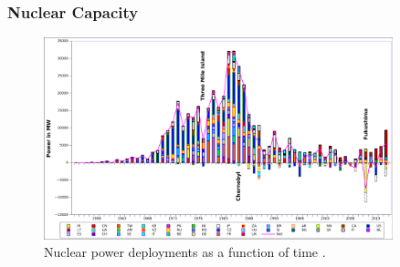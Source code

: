 \begin{frame}
  \frametitle{Nuclear Capacity}
  \begin{figure}[htbp!]
    \begin{center}
      \includegraphics[width=0.9\textwidth]{./images/nuclear-nations-deployments.png}
    \end{center}
          \caption{Nuclear power deployments as a function of time
          \cite{torsch_global_2013}.}
    \label{fig:nuc-nations-deployments}
\end{figure}
\end{frame}

